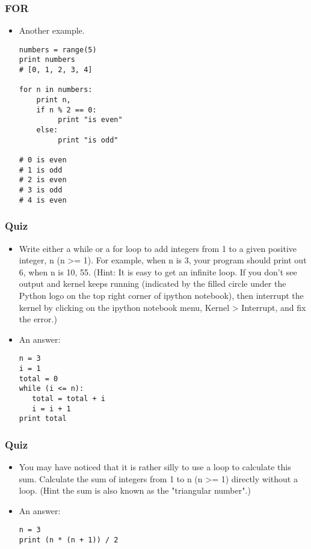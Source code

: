 \documentclass{beamer}
\begin{document}
\begin{frame}[fragile]
\frametitle{FOR}
\begin{itemize}
\item Another example.
\begin{lstlisting}
numbers = range(5)
print numbers
# [0, 1, 2, 3, 4]

for n in numbers:
    print n,
    if n % 2 == 0:
         print "is even"
    else:
         print "is odd" 

# 0 is even
# 1 is odd
# 2 is even
# 3 is odd
# 4 is even      
\end{lstlisting}
\end{itemize}
\end{frame}

\begin{frame}[fragile]
\frametitle{Quiz}
\begin{itemize}
\item Write either a while or a for loop to add integers from 1 to
    a given positive integer, n (n >= 1). For example, when n is 3,
    your program should print out 6, when n is 10, 55.
    (Hint: It is easy to get an infinite loop. If you don't see
    output and kernel keeps running (indicated by the filled circle
    under the Python logo on the top right corner of ipython notebook),
    then interrupt the kernel by clicking on the ipython notebook
    menu, Kernel > Interrupt, and fix the error.)
\item An answer:
\begin{lstlisting}[escapechar=\%]
n = 3
i = 1
total = 0
while (i <= n):
   total = total + i
   i = i + 1
print total
\end{lstlisting}
\end{itemize}
\end{frame}


\begin{frame}[fragile]
\frametitle{Quiz}
\begin{itemize}
\item You may have noticed that it is rather silly to use a loop
    to calculate this sum. Calculate the sum of integers from 1
    to n (n >= 1) directly without a loop. (Hint the sum is also
    known as the "triangular number".)
\item An answer:
\begin{lstlisting}[escapechar=\%]
n = 3
print (n * (n + 1)) / 2
\end{lstlisting}
\end{itemize}
\end{frame}
\end{document}
